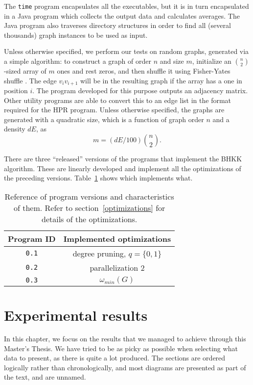 \documentclass{cslthse-msc}
\newcommand{\code}{\texttt}
\newcommand{\density}{dE}
\begin{document}
The \code{time} program encapsulates all the executables, but it is in turn encapsulated in a Java program which collects the output data and calculates averages. The Java program also traverses directory structures in order to find all (several thousands) graph instances to be used as input.

Unless otherwise specified, we perform our tests on random graphs, generated via a simple algorithm: to construct a graph of order $n$ and size $m$, initialize an $\binom{n}{2}$-sized array of $m$ ones and rest zeros, and then shuffle it using Fisher-Yates shuffle \cite[p. 145]{knuth2}. The edge $v_iv_{i+1}$ will be in the resulting graph if the array has a one in position $i$. The program developed for this purpose outputs an adjacency matrix. Other utility programs are able to convert this to an edge list in the format required for the HPR program. Unless otherwise specified, the graphs are generated with a quadratic size, which is a function of graph order $n$ and a density $\density{}$, as
\[ m = (\density{} / 100) \binom{n}{2}.\]

There are three ``released'' versions of the programs that implement the BHKK algorithm. These are linearly developed and implement all the optimizations of the preceding versions. Table~\ref{versions} shows which implements what.

\begin{table}[t]\centering
 \begin{tabular}{c|c} \hline
  Program ID & Implemented optimizations \\ \hline
  \code{0.1} & degree pruning, $q = \{0, 1\}$ \\ \hline
  \code{0.2} & parallelization 2 \\ \hline
  \code{0.3} & $\omega_{min}(G)$ \\ \hline
 \end{tabular}
 \caption{Reference of program versions and characteristics of them. Refer to section~\ref{optimizations} for details of the optimizations.}
 \label{versions}
\end{table}


\chapter{Experimental results}
In this chapter, we focus on the results that we managed to achieve through this Master's Thesis. We have tried to be as picky as possible when selecting what data to present, as there is quite a lot produced. The sections are ordered logically rather than chronologically, and most diagrams are presented as part of the text, and are unnamed.
\end{document}
